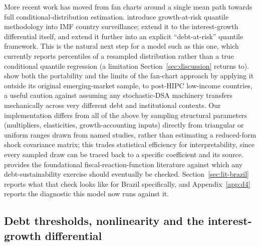 \documentclass[11pt,a4paper]{article}
\begin{document}
More recent work has moved from fan charts around a single mean path towards full conditional-distribution estimation. \citet{prasadetal2019growthatrisk} introduce growth-at-risk quantile methodology into IMF country surveillance; \citet{lianpresbiterowiriadinata2020} extend it to the interest-growth differential itself, and \citet{furcerietal2025debtrisk} extend it further into an explicit ``debt-at-risk'' quantile framework. This is the natural next step for a model such as this one, which currently reports percentiles of a resampled distribution rather than a true conditional quantile regression (a limitation Section~\ref{sec:discussion} returns to). \citet{kaffomelouetal2014} show both the portability and the limits of the fan-chart approach by applying it outside its original emerging-market sample, to post-HIPC low-income countries, a useful caution against assuming any stochastic-DSA machinery transfers mechanically across very different debt and institutional contexts. Our implementation differs from all of the above by sampling structural parameters (multipliers, elasticities, growth-accounting inputs) directly from triangular or uniform ranges drawn from named studies, rather than estimating a reduced-form shock covariance matrix; this trades statistical efficiency for interpretability, since every sampled draw can be traced back to a specific coefficient and its source. \citet{bohn1998} provides the foundational fiscal-reaction-function literature against which any debt-sustainability exercise should eventually be checked. Section~\ref{sec:lit-brazil} reports what that check looks like for Brazil specifically, and Appendix~\ref{app:d4} reports the diagnostic this model now runs against it.

\subsection{Debt thresholds, nonlinearity and the interest-growth differential}
\label{sec:lit-threshold}
\end{document}
